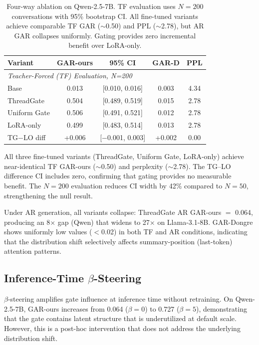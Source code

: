 \documentclass[11pt,a4paper]{article}
\begin{document}
\begin{table}[t]
\centering
\small
\caption{Four-way ablation on Qwen-2.5-7B. TF evaluation uses $N{=}200$ conversations with 95\% bootstrap CI. All fine-tuned variants achieve comparable TF GAR ($\sim$0.50) and PPL ($\sim$2.78), but AR GAR collapses uniformly. Gating provides zero incremental benefit over LoRA-only.}
\label{tab:main}
\begin{tabular}{@{}lcccc@{}}
\toprule
Variant & GAR-ours & 95\% CI & GAR-D & PPL \\
\midrule
\multicolumn{5}{l}{\textit{Teacher-Forced (TF) Evaluation, N=200}} \\
Base & 0.013 & [0.010, 0.016] & 0.003 & 4.34 \\
ThreadGate & 0.504 & [0.489, 0.519] & 0.015 & 2.78 \\
Uniform Gate & 0.506 & [0.491, 0.521] & 0.012 & 2.78 \\
LoRA-only & 0.499 & [0.483, 0.514] & 0.013 & 2.78 \\
\midrule
TG$-$LO diff & +0.006 & [$-$0.001, 0.003] & +0.002 & 0.00 \\
\bottomrule
\end{tabular}
\end{table}

All three fine-tuned variants (ThreadGate, Uniform Gate, LoRA-only) achieve near-identical TF GAR-ours ($\sim$0.50) and perplexity ($\sim$2.78). The TG--LO difference CI includes zero, confirming that gating provides no measurable benefit. The $N{=}200$ evaluation reduces CI width by 42\% compared to $N{=}50$, strengthening the null result.

Under AR generation, all variants collapse: ThreadGate AR GAR-ours $=$ 0.064, producing an 8$\times$ gap (Qwen) that widens to 27$\times$ on Llama-3.1-8B. GAR-Dongre shows uniformly low values ($<$0.02) in both TF and AR conditions, indicating that the distribution shift selectively affects summary-position (last-token) attention patterns.

\subsection{Inference-Time $\beta$-Steering}

$\beta$-steering amplifies gate influence at inference time without retraining. On Qwen-2.5-7B, GAR-ours increases from 0.064 ($\beta{=}0$) to 0.727 ($\beta{=}5$), demonstrating that the gate contains latent structure that is underutilized at default scale. However, this is a post-hoc intervention that does not address the underlying distribution shift.
\end{document}
